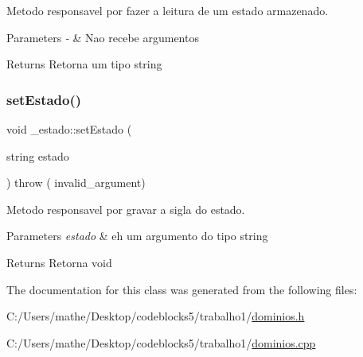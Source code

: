 Metodo responsavel por fazer a leitura de um estado armazenado. 


\begin{DoxyParams}{Parameters}
{\em -\/} & Nao recebe argumentos \\
\hline
\end{DoxyParams}
\begin{DoxyReturn}{Returns}
Retorna um tipo string 
\end{DoxyReturn}
\mbox{\label{class__estado_a1fb6884e0493436dd737773f9d47390b}} 
\subsubsection{\texorpdfstring{setEstado()}{setEstado()}}
{\footnotesize\ttfamily void \+\_\+estado\+::set\+Estado (\begin{DoxyParamCaption}\item[{string}]{estado }\end{DoxyParamCaption}) throw ( invalid\+\_\+argument) }



Metodo responsavel por gravar a sigla do estado. 


\begin{DoxyParams}{Parameters}
{\em estado} & eh um argumento do tipo string \\
\hline
\end{DoxyParams}
\begin{DoxyReturn}{Returns}
Retorna void 
\end{DoxyReturn}


The documentation for this class was generated from the following files\+:\begin{DoxyCompactItemize}
\item 
C\+:/\+Users/mathe/\+Desktop/codeblocks5/trabalho1/\mbox{\hyperlink{dominios_8h}{dominios.\+h}}\item 
C\+:/\+Users/mathe/\+Desktop/codeblocks5/trabalho1/\mbox{\hyperlink{dominios_8cpp}{dominios.\+cpp}}\end{DoxyCompactItemize}
